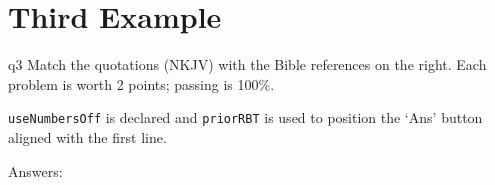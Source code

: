 \documentclass[11pt]{article}
\def\cs#1{\texttt{\eqbs#1}}
\begin{document}
\newpage

\section*{Third Example}

\begin{quiz*}{q3}
Match the quotations (\textsf{NKJV)} with the Bible references on the right.
Each problem is worth 2 points; passing is 100\%.

\cs{useNumbersOff} is declared and \cs{priorRBT} is used to position the `\textsf{Ans}'
button aligned with the first line.

\useMCCircles

\noindent
\begin{minipage}[t]{.75\linewidth-\eflength}
\useNumbersOff
\priorRBT{\makebox[0pt][l]{\hspace{\RBTWidth}\hspace{\labelsep}\hspace{\linewidth}\enspace#1\enspace}}
\adjCAB{}
\begin{questions}
\begin{BblPsg}
  \item{}
  \item{}
  \item{}
\end{BblPsg}

\end{questions}
\end{minipage}
\hfill
\begin{minipage}[t]{.25\linewidth}
\begin{questions}[itemsep={0pt},labelwidth={1em}]
\begin{BblVrs}
  \item{}
  \item{}
  \item{}
  \item{}
  \item{}
  \item{}
\end{BblVrs}
\end{questions}
\end{minipage}\hfil
\par\medskip
\end{quiz*}\quad\PointsField\currQuiz\olBdry\CorrButton\currQuiz\cgBdry[6pt]
Answers: 
\end{document}
